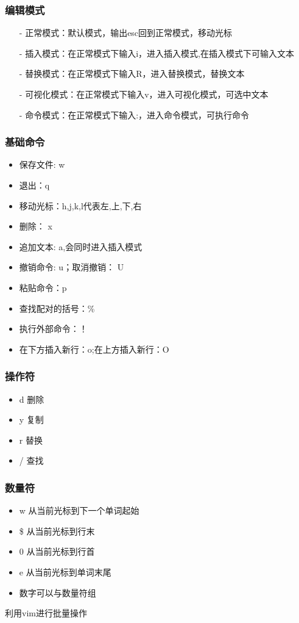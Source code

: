 \documentclass[a4paper,12pt]{article}
\begin{document}
\subsubsection{\color{green}编辑模式}
\begin{itemize}
    \item[-] 正常模式：默认模式，输出esc回到正常模式，移动光标
    \item[-] 插入模式：在正常模式下输入i，进入插入模式,在插入模式下可输入文本
    \item[-] 替换模式：在正常模式下输入R，进入替换模式，替换文本
    \item[-] 可视化模式：在正常模式下输入v，进入可视化模式，可选中文本
    \item[-] 命令模式：在正常模式下输入:，进入命令模式，可执行命令
\end{itemize}
\subsubsection{\color{green}基础命令}
\begin{itemize}
    \item 保存文件: w 
    \item 退出：q
    \item 移动光标：h,j,k,l代表左,上,下,右
    \item 删除： x
    \item 追加文本: a,会同时进入插入模式 
    \item 撤销命令: u；取消撤销： U
    \item 粘贴命令：p
    \item 查找配对的括号：\%
    \item 执行外部命令：！
    \item 在下方插入新行：o;在上方插入新行：O

\end{itemize}
\subsubsection{\color{green}操作符}
\begin{itemize}
    \item d 删除
    \item y 复制
    \item r 替换
    \item / 查找
\end{itemize}
\subsubsection{\color{green}数量符}
    \begin{itemize}
        \item w 从当前光标到下一个单词起始
        \item \$ 从当前光标到行末
        \item 0 从当前光标到行首
        \item e 从当前光标到单词末尾
        \item 数字可以与数量符组
    \end{itemize}
利用vim进行批量操作
\end{document}
